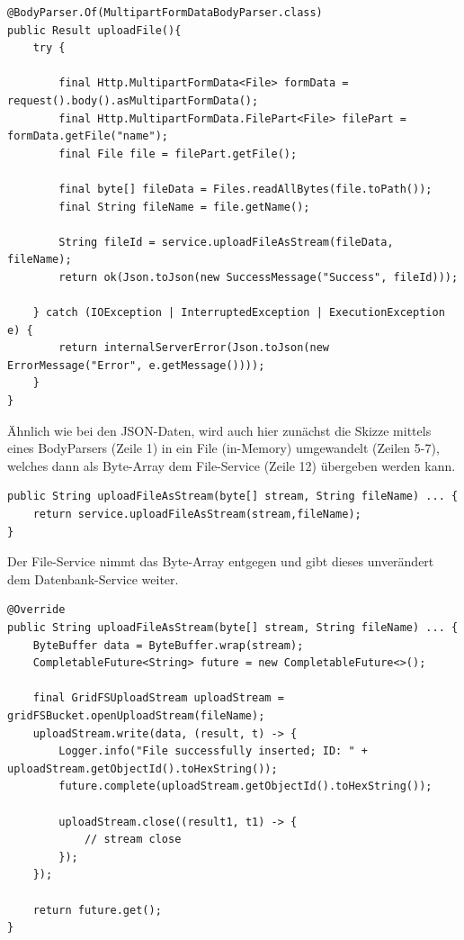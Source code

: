 \begin{lstlisting}[caption={Upload File im File Controller}, label=uploadFileController]
@BodyParser.Of(MultipartFormDataBodyParser.class)
public Result uploadFile(){
    try {

	    final Http.MultipartFormData<File> formData = request().body().asMultipartFormData();
	    final Http.MultipartFormData.FilePart<File> filePart = formData.getFile("name");
	    final File file = filePart.getFile();
	
	    final byte[] fileData = Files.readAllBytes(file.toPath());
	    final String fileName = file.getName();
	
	    String fileId = service.uploadFileAsStream(fileData, fileName);
	    return ok(Json.toJson(new SuccessMessage("Success", fileId)));

    } catch (IOException | InterruptedException | ExecutionException  e) {
        return internalServerError(Json.toJson(new ErrorMessage("Error", e.getMessage())));
    }
}
\end{lstlisting}

Ähnlich wie bei den JSON-Daten, wird auch hier zunächst die Skizze mittels eines BodyParsers (Zeile 1) in ein File (in-Memory) umgewandelt (Zeilen 5-7), welches dann als Byte-Array dem File-Service (Zeile 12) übergeben werden kann. 

\begin{lstlisting}[caption={Upload File im File Service}, label=uploadFileService]
public String uploadFileAsStream(byte[] stream, String fileName) ... {
    return service.uploadFileAsStream(stream,fileName);
}
\end{lstlisting}

Der File-Service nimmt das Byte-Array entgegen und gibt dieses unverändert dem Datenbank-Service weiter.

\begin{lstlisting}[caption={Upload File im DB Service}, label=uploadFileDBService]
@Override
public String uploadFileAsStream(byte[] stream, String fileName) ... {
    ByteBuffer data = ByteBuffer.wrap(stream);
    CompletableFuture<String> future = new CompletableFuture<>();

    final GridFSUploadStream uploadStream = gridFSBucket.openUploadStream(fileName);
    uploadStream.write(data, (result, t) -> {
        Logger.info("File successfully inserted; ID: " + uploadStream.getObjectId().toHexString());
        future.complete(uploadStream.getObjectId().toHexString());

        uploadStream.close((result1, t1) -> {
            // stream close
        });
    });

    return future.get();
}
\end{lstlisting}

